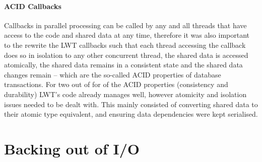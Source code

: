 \documentclass[12pt,twoside,notitlepage]{report}
\begin{document}
\paragraph{ACID Callbacks}
Callbacks in parallel processing can be called by any and all threads that have access to the code and shared data at any time, therefore it was also important to the rewrite the LWT callbacks such that each thread accessing the callback does
so in isolation to any other concurrent thread, the shared data is accessed atomically, the shared data remains in a consistent state and the shared data changes remain -- which are the so-called ACID properties of database
transactions. For two out of for of the ACID properties (consistency and durability) LWT's code already manages well, however atomicity and isolation issues needed to be dealt with. This mainly consisted of converting shared data to
their atomic type equivalent, and ensuring data dependencies were kept serialised.


\section{Backing out of I/O}
\label{sec:backing_out_of_io}
%
%

%
%

%
%

%
%

%
%

%
%
\end{document}
